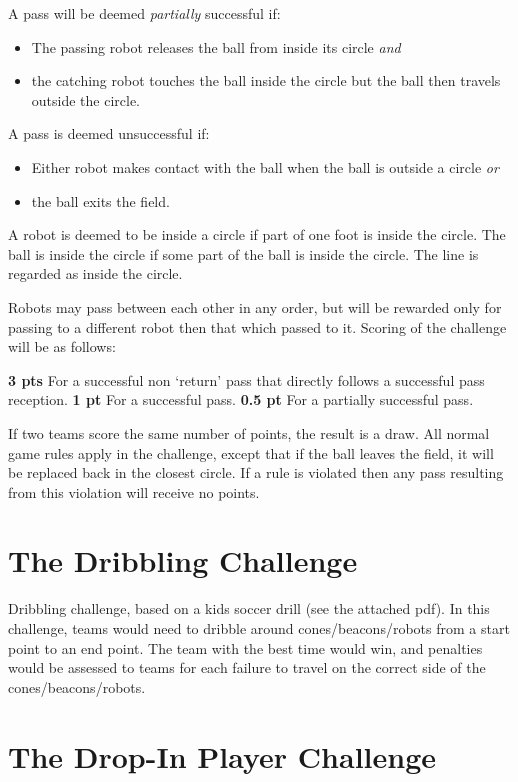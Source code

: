 \documentclass{article}
\begin{document}
A pass will be deemed \emph{partially} successful if:
\begin{itemize}
\item The passing robot releases the ball from inside its circle \emph{and}
\item the catching robot touches the ball inside the circle but the ball then travels outside the circle.
\end{itemize}

A pass is deemed unsuccessful if:
\begin{itemize}
\item Either robot makes contact with the ball when the ball is outside a circle \emph{or}
\item the ball exits the field.
\end{itemize}

A robot is deemed to be inside a circle if part of one foot is inside the circle. The ball is
inside the circle if some part of the ball is inside the circle. The line is regarded as inside the circle.

Robots may pass between each other in any order, but will be rewarded only for passing
to a different robot then that which passed to it. Scoring of the challenge will be as
follows:

\textbf{3 pts} For a successful non `return' pass that directly follows a successful pass reception.
\textbf{1 pt} For a successful pass.
\textbf{0.5 pt} For a partially successful pass.

If two teams score the same number of points, the result is a draw. All normal game rules apply in the challenge, 
except that if the ball leaves the field, it will be replaced back in the closest circle.
If a rule is violated then any pass resulting from this violation will receive no points.

\section{The Dribbling Challenge}
\label{sec:dribbling}
Dribbling challenge, based on a kids soccer drill (see the attached
pdf).  In this challenge, teams would need to dribble around
cones/beacons/robots from a start point to an end point.  The team
with the best time would win, and penalties would be assessed to teams
for each failure to travel on the correct side of the
cones/beacons/robots.

\section{The Drop-In Player Challenge}
\label{sec:dropIn}
\end{document}
